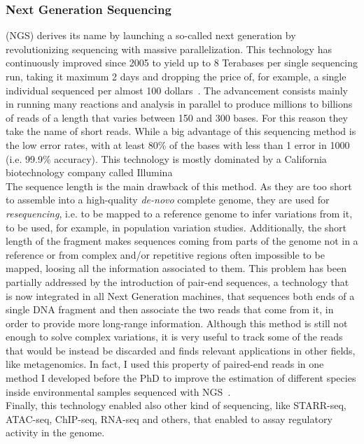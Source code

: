 \subsubsection{Next Generation Sequencing} (NGS) derives its name by launching a so-called next generation by revolutionizing sequencing with massive parallelization. This technology has continuously improved since 2005 to yield up to 8 Terabases per single sequencing run, taking it maximum 2 days and dropping the price of, for example, a single individual sequenced per almost 100 dollars~\cite{100dollars}. The advancement consists mainly in running many reactions and analysis in parallel to produce millions to billions of reads of a length that varies between 150 and 300 bases. For this reason they take the name of short reads. While a big advantage of this sequencing method is the low error rates, with at least 80\% of the bases with less than 1 error in 1000 (i.e. 99.9\% accuracy). This technology is mostly dominated by a California biotechnology company called Illumina \\
The sequence length is the main drawback of this method. As they are too short to assemble into a high-quality \emph{de-novo} complete genome, they are used for \emph{resequencing}, i.e. to be mapped to a reference genome to infer variations from it, to be used, for example, in population variation studies. Additionally, the short length of the fragment makes sequences coming from parts of the genome not in a reference or from complex and/or repetitive regions often impossible to be mapped, loosing all the information associated to them.
This problem has been partially addressed by the introduction of pair-end sequences, a technology that is now integrated in all Next Generation machines, that sequences both ends of a single DNA fragment and then associate the two reads that come from it, in order to provide more long-range information. Although this method is still not enough to solve complex variations, it is very useful to track some of the reads that would be instead be discarded and finds relevant applications in other fields, like metagenomics. In fact, I used this property of paired-end reads in one method I developed before the PhD to improve the estimation of different species inside environmental samples sequenced with NGS~\cite{metaprob2}. \\
Finally, this technology enabled also other kind of sequencing, like STARR-seq, ATAC-seq, ChIP-seq, RNA-seq and others, that enabled to assay regulatory activity in the genome.
